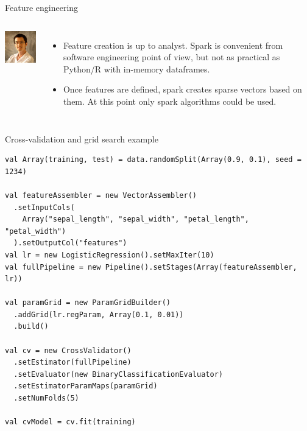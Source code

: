 \documentclass[unicode, notheorems]{beamer}
\begin{document}
\begin{frame}{Feature engineering}
\begin{columns}
\begin{center}
	\includegraphics[width=3.2cm]{images/scientist}
\end{center}

\begin{itemize}
\item Feature creation is up to analyst. Spark is convenient from software engineering point of view, but not as practical as Python/R with in-memory dataframes.
\item Once features are defined, spark creates sparse vectors based on them. At this point only spark algorithms could be used. 
\end{itemize}
\end{columns}
\end{frame}

\begin{frame}[fragile]{Cross-validation and grid search example}

{\footnotesize
\begin{verbatim}
val Array(training, test) = data.randomSplit(Array(0.9, 0.1), seed = 1234)

val featureAssembler = new VectorAssembler()
  .setInputCols(
    Array("sepal_length", "sepal_width", "petal_length", "petal_width")
  ).setOutputCol("features")
val lr = new LogisticRegression().setMaxIter(10)
val fullPipeline = new Pipeline().setStages(Array(featureAssembler, lr))

val paramGrid = new ParamGridBuilder()
  .addGrid(lr.regParam, Array(0.1, 0.01))
  .build()

val cv = new CrossValidator()
  .setEstimator(fullPipeline)
  .setEvaluator(new BinaryClassificationEvaluator)
  .setEstimatorParamMaps(paramGrid)
  .setNumFolds(5)

val cvModel = cv.fit(training)
\end{verbatim}
}
\end{frame}
\end{document}
